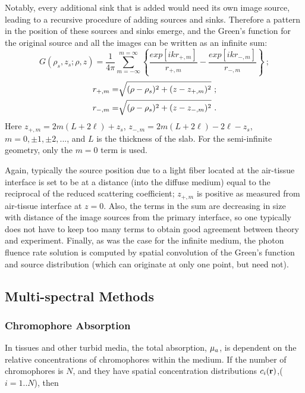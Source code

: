 Notably, every additional sink that is added would need its own image source, leading to a recursive procedure of adding sources and sinks. Therefore a pattern in the position of these sources and sinks emerge, and the Green's function for the original source and all the images can be written as an infinite sum:
\begin{equation}
G(\rho_s,z_s;\rho,z) = \frac{1}{4\pi} \sum_{m=-\infty}^{m=\infty} 
\left\{ \frac{exp[ikr_{+,m}]}{r_{+,m}} - \frac{exp[ikr_{-,m}]}{r_{-,m}} \right\} \ ;
\end{equation}
\vspace{-20mm}
\begin{eqnarray}
\label{ext_both}
r_{+,m} = & \sqrt{(\rho-\rho_s)^2+(z-z_{+,m})^2} \ ; \notag \\
r_{-,m} = & \sqrt{(\rho-\rho_s)^2+(z-z_{-,m})^2} \ .
\end{eqnarray}
\noindent
Here $z_{+,m}=2m(L+2\ell)+z_s$, $z_{-,m}=2m(L+2\ell)-2\ell-z_s$, $m=0,\pm 1, \pm 2, ...$, and $L$ is the thickness of the slab. For the semi-infinite geometry, only the $m=0$ term is used. 

Again, typically the source position due to a light fiber located at the air-tissue interface is set to be at a distance (into the diffuse medium) equal to the reciprocal of the reduced scattering coefficient; $z_{+,m}$ is positive as measured from air-tissue interface at $z=0$. Also, the terms in the sum are decreasing in size with distance of the image sources from the primary interface, so one typically does not have to keep too many terms to obtain good agreement between theory and experiment. Finally, as was the case for the infinite medium, the photon fluence rate solution is computed by spatial convolution of the Green's function and source distribution (which can originate at only one point, but need not).
%
\subsection{Multi-spectral Methods}
\subsubsection{Chromophore Absorption}
In tissues and other turbid media, the total absorption, $\mu_a$, is dependent on the relative concentrations of chromophores within the medium. If the number of chromophores is $N$, and they have spatial concentration distributions $c_i(\mathbf{r})$,($i=1..N$), then 

